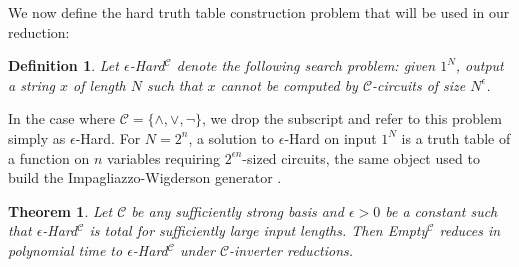 \documentclass[11pt]{article}
\newtheorem{theorem}{Theorem}
\newtheorem{definition}{Definition}
\begin{document}
We now define the hard truth table construction problem that will be used in our reduction:
\begin{definition}
Let {\sc $\epsilon$-Hard}$^{\mathcal{C}}$ denote the following search problem: given $1^N$, output a string $x$ of length $N$ such that $x$ cannot be computed by $\mathcal{C}$-circuits of size $N^\epsilon$.
\end{definition}
In the case where $\mathcal{C} =\{\land,\lor,\lnot\}$, we drop the subscript and refer to this problem simply as {\sc $\epsilon$-Hard}.
For $N = 2^n$, a solution to {\sc $\epsilon$-Hard} on input $1^N$ is a truth table of a function on $n$ variables requiring $2^{\epsilon n}$-sized circuits, the same object used to build the Impagliazzo-Wigderson generator \cite{IW}.

\begin{theorem}\label{thm:epsilon-hard-reduction}
Let $\mathcal{C}$ be any sufficiently strong basis and $\epsilon > 0$ be a constant such that {\sc $\epsilon$-Hard}$^{\mathcal{C}}$ is total for sufficiently large input lengths. Then {\sc Empty}$^{\mathcal{C}}$ reduces in polynomial time to {\sc $\epsilon$-Hard}$^{\mathcal{C}}$ under $\mathcal{C}$-inverter reductions.
\end{theorem}
\end{document}
